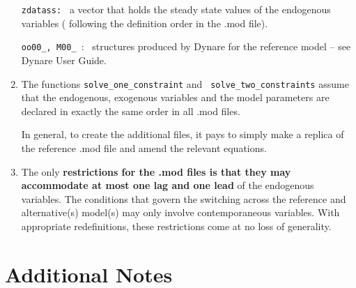 \documentclass[12pt]{article}
\begin{document}
\begin{enumerate}
\texttt{zdatass:\ } a vector that holds the steady state values of the
endogenous variables ( following the definition order in the .mod file).

\texttt{oo00\_, M00\_ }: \ structures produced by Dynare for the reference
model -- see Dynare User Guide.

\item The functions \texttt{solve\_one\_constraint} and \texttt{%
solve\_two\_constraints} assume that the endogenous, exogenous variables and
the model parameters are declared in exactly the same order in all .mod
files.

In general, to create the additional files, it pays to simply make a replica
of the reference .mod file and amend the relevant equations.

\item The only \textbf{restrictions for the .mod files is that they may
accommodate at most one lag and one lead} of the endogenous variables. The
conditions that govern the switching across the reference and alternative(s)
model(s) may only involve contemporaneous variables. With appropriate
redefinitions, these restrictions come at no loss of generality.
\end{enumerate}

\section{Additional Notes}
\end{document}
